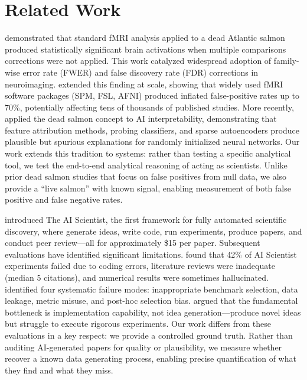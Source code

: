 \section{Related Work}
\label{sec:related}

\citet{bennett2009neural} demonstrated that standard fMRI analysis applied to a dead Atlantic salmon produced statistically significant brain activations when multiple comparisons corrections were not applied.
This work catalyzed widespread adoption of family-wise error rate (FWER) and false discovery rate (FDR) corrections in neuroimaging.
\citet{eklund2016cluster} extended this finding at scale, showing that widely used fMRI software packages (SPM, FSL, AFNI) produced inflated false-positive rates up to 70\%, potentially affecting tens of thousands of published studies.
More recently, \citet{meloux2025dead} applied the dead salmon concept to AI interpretability, demonstrating that feature attribution methods, probing classifiers, and sparse autoencoders produce plausible but spurious explanations for randomly initialized neural networks.
Our work extends this tradition to \aiscientist systems: rather than testing a specific analytical tool, we test the end-to-end analytical reasoning of \llms acting as scientists.
Unlike prior dead salmon studies that focus on false positives from null data, we also provide a ``live salmon'' with known signal, enabling measurement of both false positive and false negative rates.

\citet{lu2024ai} introduced The AI Scientist, the first framework for fully automated scientific discovery, where \llms generate ideas, write code, run experiments, produce papers, and conduct peer review---all for approximately \$15 per paper.
Subsequent evaluations have identified significant limitations.
\citet{beel2025evaluating} found that 42\% of AI Scientist experiments failed due to coding errors, literature reviews were inadequate (median 5 citations), and numerical results were sometimes hallucinated.
\citet{luo2025more} identified four systematic failure modes: inappropriate benchmark selection, data leakage, metric misuse, and post-hoc selection bias.
\citet{zhu2025ai} argued that the fundamental bottleneck is implementation capability, not idea generation---\llms produce novel ideas but struggle to execute rigorous experiments.
Our work differs from these evaluations in a key respect: we provide a controlled ground truth.
Rather than auditing AI-generated papers for quality or plausibility, we measure whether \aiscientists recover a known data generating process, enabling precise quantification of what they find and what they miss.


